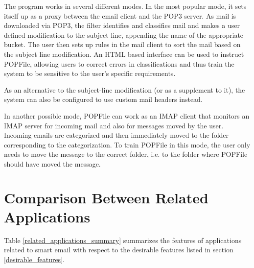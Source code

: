 The program works in several different modes. In the most popular mode, it sets 
itself up as a proxy between the email client and the POP3 server. As mail is 
downloaded via POP3, the filter identifies and classifies mail and makes a user 
defined modification to the subject line, appending the name of the appropriate 
bucket. The user then sets up rules in the mail client to sort the mail based 
on the subject line modification. An HTML based interface can be used to instruct 
POPFile, allowing users to correct errors in classifications and thus train the 
system to be sensitive to the user's specific requirements.

As an alternative to the subject-line modification (or as a supplement to it), 
the system can also be configured to use custom mail headers instead.

In another possible mode, POPFile can work as an IMAP client that monitors an 
IMAP server for incoming mail and also for messages moved by the user. Incoming 
emails are categorized and then immediately moved to the folder corresponding 
to the categorization. To train POPFile in this mode, the user only needs to 
move the message to the correct folder, i.e. to the folder where POPFile should 
have moved the message.

\section{Comparison Between Related Applications}
Table \ref{related_applications_summary} summarizes the features of applications related to smart email with respect to the desirable features listed in section \ref{desirable_features}.

